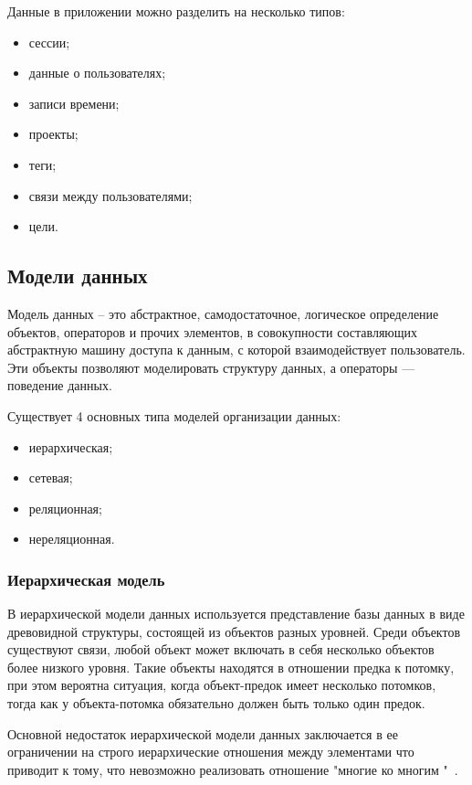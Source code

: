 Данные в приложении можно разделить на несколько типов:

\begin{itemize}[leftmargin=1.6\parindent]
	\item сессии;
	\item данные о пользователях;
	\item записи времени;
	\item проекты;
	\item теги;
	\item связи между пользователями;
	\item цели.
\end{itemize}

\newpage
\subsection{Модели данных}

Модель данных --  это абстрактное, самодостаточное, логическое
определение объектов, операторов и прочих элементов, в совокупности
составляющих абстрактную машину доступа к данным, с которой
взаимодействует пользователь. Эти объекты позволяют моделировать
структуру данных, а операторы — поведение данных\cite{db}.

Существует 4 основных типа моделей организации данных:

\begin{itemize}[leftmargin=1.6\parindent]
	\item иерархическая;
	\item сетевая;
	\item реляционная;
	\item нереляционная.
\end{itemize}

\subsubsection{Иерархическая модель}

В иерархической модели данных используется представление базы данных
в виде древовидной структуры, состоящей из объектов разных уровней. Среди
объектов существуют связи, любой объект может включать в себя нес\-колько
объектов более низкого уровня. Такие объекты находятся в отношении предка к
потомку, при этом вероятна ситуация, когда объект-предок имеет нес\-колько
потомков, тогда как у объекта-потомка обязательно должен быть только один
предок.

Основной недостаток иерархической модели данных заключается в ее ограничении на строго иерархические отношения между элементами что приводит к тому, что невозможно реализовать отношение "многие ко многим "\ .

